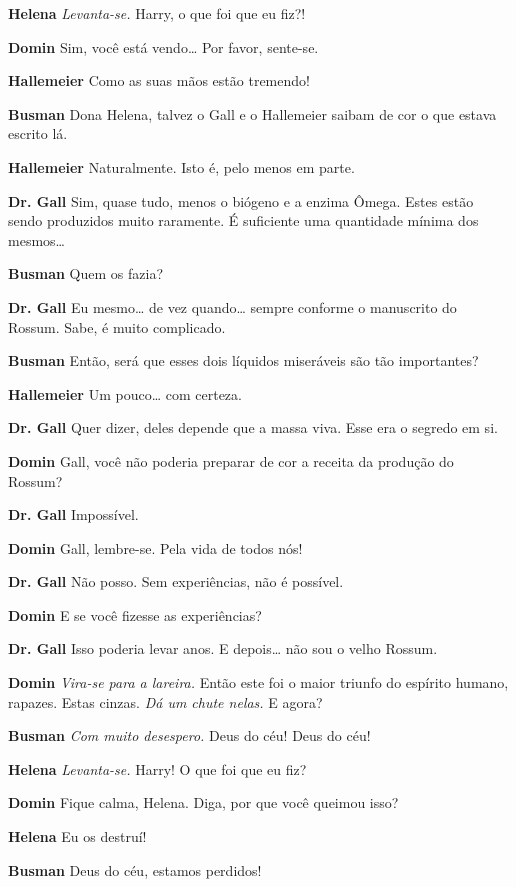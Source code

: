 \textbf{Helena} \emph{Levanta-se.} Harry, o que foi que eu fiz?!

\textbf{Domin} Sim, você está vendo\ldots{} Por favor, sente-se.

\textbf{Hallemeier} Como as suas mãos estão tremendo!

\textbf{Busman} Dona Helena, talvez o Gall e o Hallemeier saibam de cor o
que estava escrito lá.

\textbf{Hallemeier} Naturalmente. Isto é, pelo menos em parte.

\textbf{Dr. Gall} Sim, quase tudo, menos o biógeno e a enzima Ômega. Estes estão sendo
produzidos muito raramente. É suficiente uma quantidade mínima dos mesmos\ldots{}

\textbf{Busman} Quem os fazia?

\textbf{Dr. Gall} Eu mesmo\ldots{} de vez quando\ldots{} sempre conforme o manuscrito do
Rossum. Sabe, é muito complicado.

\textbf{Busman} Então, será que esses dois líquidos miseráveis são tão importantes?

\textbf{Hallemeier} Um pouco\ldots{} com certeza.

\textbf{Dr. Gall} Quer dizer, deles depende que a massa viva. Esse era o segredo em si.

\textbf{Domin} Gall, você não poderia preparar de cor a receita da produção do Rossum?

\textbf{Dr. Gall} Impossível.

\textbf{Domin} Gall, lembre-se. Pela vida de todos nós!

\textbf{Dr. Gall} Não posso. Sem experiências, não é possível.

\textbf{Domin} E se você fizesse as experiências?

\textbf{Dr. Gall} Isso poderia levar anos. E depois\ldots{} não sou o velho Rossum.

\textbf{Domin} \emph{Vira-se para a lareira.} Então este foi o maior triunfo
do espírito humano, rapazes. Estas cinzas. \emph{Dá um chute nelas.} E agora?

\textbf{Busman} \emph{Com muito desespero.} Deus do céu! Deus do céu!

\textbf{Helena} \emph{Levanta-se.} Harry! O que foi que eu fiz?

\textbf{Domin} Fique calma, Helena. Diga, por que você queimou isso?

\textbf{Helena} Eu os destruí!

\textbf{Busman} Deus do céu, estamos perdidos!


